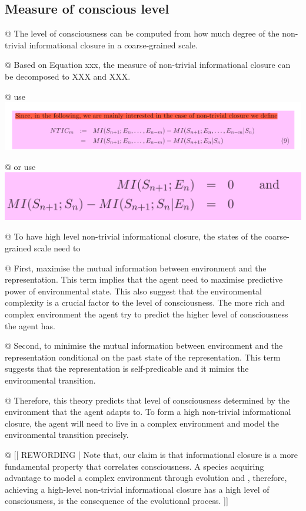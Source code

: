 \documentclass[utf8]{article}
\newenvironment{ants}
			{
			 \begin{easylist}[itemize]		
		 	}
			{
			\end{easylist}
			}
\newcommand{\rewording}[1]{\textcolor{RawSienna}{[[ REWORDING | #1 ]]}}
\begin{document}
		
		
		\subsection{Measure of conscious level}
			\begin{ants}
				@ The level of consciousness can be computed from how much degree of the non-trivial informational closure in a coarse-grained scale.
				
				@ Based on Equation xxx, the measure of non-trivial informational closure can be decomposed to XXX and XXX.
				
				@ use \includegraphics{WritingMaterials/PDFXCview_2018-06-01_17-44-30.png}
				
				@ or use \includegraphics{WritingMaterials/PDFXCview_2018-06-04_19-18-12.png}
				
				@ To have high level non-trivial informational closure, the states of the coarse-grained scale need to
				
				@ First, maximise the mutual information between environment and the representation.
				This term implies that the agent need to maximise predictive power of environmental state. This also suggest that the environmental complexity is a crucial factor to the level of consciousness. The more rich and complex environment the agent try to predict the higher level of consciousness the agent has. 
				
				
				@ Second, to minimise the mutual information between environment and the representation conditional on the past state of the representation. This term suggests that the representation is self-predicable and it mimics the environmental transition. 
				
				@ Therefore, this theory predicts that level of consciousness determined by the environment that the agent adapts to. To form a high non-trivial informational closure, the agent will need to live in a complex environment and model the environmental transition precisely. 
				
				@ \rewording{Note that, our claim is that informational closure is a more fundamental property that correlates consciousness. A species acquiring advantage to model a complex environment through evolution and , therefore, achieving a high-level non-trivial informational closure has a high level of consciousness, is the consequence of the evolutional process. }
				
				
			\end{ants}
		
\end{document}
